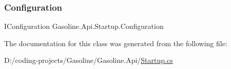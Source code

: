 \subsubsection{\texorpdfstring{Configuration}{Configuration}}
{\footnotesize\ttfamily I\+Configuration Gasoline.\+Api.\+Startup.\+Configuration\hspace{0.3cm}{\ttfamily [get]}}



The documentation for this class was generated from the following file\+:\begin{DoxyCompactItemize}
\item 
D\+:/coding-\/projects/\+Gasoline/\+Gasoline.\+Api/\mbox{\hyperlink{_startup_8cs}{Startup.\+cs}}\end{DoxyCompactItemize}
